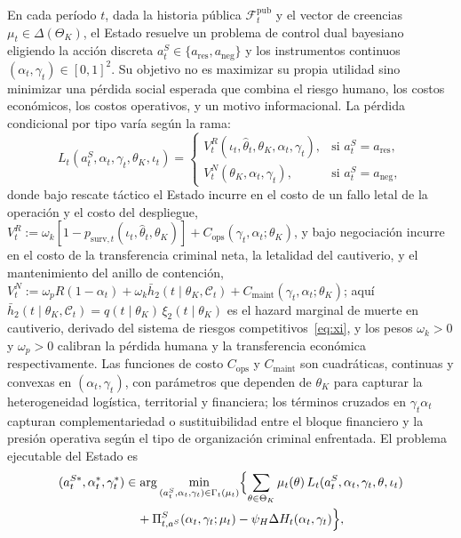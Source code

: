\documentclass[pdflatex,sn-mathphys-ay]{sn-jnl}
\theoremstyle{thmstyleone}
\theoremstyle{thmstyletwo}
\theoremstyle{thmstylethree}
\newcommand{\ThetaK}{\Theta_K}
\newcommand{\1}{\mathbf{1}}
\begin{document}
\noindent En cada período $t$, dada la historia pública $\mathcal{F}_t^{\mathrm{pub}}$ y el vector de creencias $\mu_t\in\Delta(\ThetaK)$, el Estado resuelve un problema de control dual bayesiano eligiendo la acción discreta $a_t^S\in\{a_{\mathrm{res}},a_{\mathrm{neg}}\}$ y los instrumentos continuos $(\alpha_t,\gamma_t)\in[0,1]^2$. Su objetivo no es maximizar su propia utilidad sino minimizar una pérdida social esperada que combina el riesgo humano, los costos económicos, los costos operativos, y un motivo informacional. La pérdida condicional por tipo varía según la rama:
\begin{equation}
L_t(a_t^S,\alpha_t,\gamma_t,\theta_K,\iota_t)=\begin{cases}V_t^R(\iota_t,\hat{\theta}_t,\theta_K,\alpha_t,\gamma_t), & \text{si }a_t^S=a_{\mathrm{res}},\\V_t^N(\theta_K,\alpha_t,\gamma_t), & \text{si }a_t^S=a_{\mathrm{neg}},\end{cases}
\label{eq:state-loss}
\end{equation}
donde bajo rescate táctico el Estado incurre en el costo de un fallo letal de la operación y el costo del despliegue, $V_t^R:=\omega_k[1-p_{\mathrm{surv},t}(\iota_t,\hat{\theta}_t,\theta_K)]+C_{\mathrm{ops}}(\gamma_t,\alpha_t;\theta_K)$, y bajo negociación incurre en el costo de la transferencia criminal neta, la letalidad del cautiverio, y el mantenimiento del anillo de contención, $V_t^N:=\omega_pR(1-\alpha_t)+\omega_k \bar h_2(t\mid\theta_K,\mathcal{C}_t)+C_{\mathrm{maint}}(\gamma_t,\alpha_t;\theta_K)$; aquí $\bar h_2(t\mid\theta_K,\mathcal{C}_t)=q(t\mid\theta_K)\,\xi_2(t\mid\theta_K)$ es el hazard marginal de muerte en cautiverio, derivado del sistema de riesgos competitivos~\eqref{eq:xi}, y los pesos $\omega_k>0$ y $\omega_p>0$ calibran la pérdida humana y la transferencia económica respectivamente. Las funciones de costo $C_{\mathrm{ops}}$ y $C_{\mathrm{maint}}$ son cuadráticas, continuas y convexas en $(\alpha_t,\gamma_t)$, con parámetros que dependen de $\theta_K$ para capturar la heterogeneidad logística, territorial y financiera; los términos cruzados en $\gamma_t\alpha_t$ capturan complementariedad o sustituibilidad entre el bloque financiero y la presión operativa según el tipo de organización criminal enfrentada. El problema ejecutable del Estado es
\begin{equation}
\begin{aligned}
(a_t^{S\ast},\alpha_t^\ast,\gamma_t^\ast)&\in\arg\min_{(a_t^S,\alpha_t,\gamma_t)\in\Gamma_t(\mu_t)}\Bigl\{\sum_{\theta\in\ThetaK}\mu_t(\theta)\,L_t(a_t^S,\alpha_t,\gamma_t,\theta,\iota_t)\\
&\quad+\Pi_{t,a^S}^S(\alpha_t,\gamma_t;\mu_t)-\psi_H\Delta H_t(\alpha_t,\gamma_t)\Bigr\},
\end{aligned}
\label{eq:state-dual-control}
\end{equation}
\end{document}
